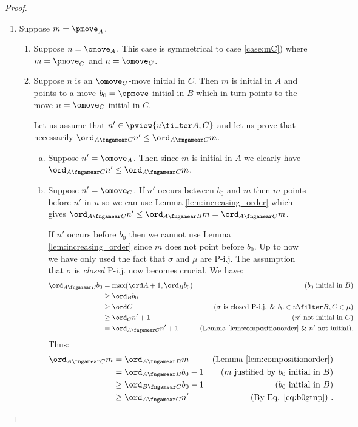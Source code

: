 \begin{proof}
\begin{enumerate}[1)]
\item \label{case:mA} Suppose $m = \pmove_A$.
\begin{enumerate}

\item Suppose $n=\omove_A$.
This case is symmetrical to case
\ref{case:mC}) where $m=\pmove_C$ and $n=\omove_C$.

\item Suppose  $n$ is an $\omove_C$-move initial in $C$.
Then $m$ is initial in $A$ and points to a move
$b_0 = \opmove$ initial in $B$ which in turn points to the
move $n =\omove_C$ initial in $C$.

Let us assume that $n'\in \pview{u\filter A,C}$ and let us prove that necessarily $\ord_{A\fngamear C} n' \leq \ord_{A\fngamear C} m$.

	\begin{enumerate}[a.]
	\item Suppose $n'=\omove_A$. Then
since $m$ is initial in $A$ we clearly have 
$\ord_{A\fngamear C} n' \leq \ord_{A\fngamear C} m$.

	\item Suppose $n'=\omove_C$.
	If $n'$ occurs between $b_0$ and $m$ then $m$ points before $n'$ in 		$u$ so we can use Lemma \ref{lem:increasing_order} which gives $\ord_{A\fngamear C} n' \leq \ord_{A\fngamear B} m
		= \ord_{A\fngamear C} m$.
		\smallskip
		
		
		If $n'$ occurs before $b_0$ then 
		we cannot use Lemma \ref{lem:increasing_order}
		since $m$ does not point before $b_0$.
Up to now we have only used the fact that $\sigma$ and $\mu$ are P-i.j. The assumption that $\sigma$ is  \emph{closed} P-i.j. now becomes crucial. We have:
		\begin{align}
		\ord_{A\fngamear B} b_0 
		& = \max(\ord A +1, \ord_B b_0) & \mbox{($b_0$ initial in $B$)} \nonumber \\
		& \geq \ord_B b_0 \nonumber  \\
		& \geq \ord C & \mbox{($\sigma$ is closed P-i.j. \& $b_0 \in u \filter  B,C \in \mu$)} \nonumber  \\
		& \geq \ord_C n' +1 & \mbox{($n'$ not initial in $C$)} \nonumber  \\
		& = \ord_{A\fngamear C} n' +1 & \mbox{(Lemma \ref{lem:compositionorder} \& $n'$ not initial)}. \label{eq:b0gtnp}
		\end{align}
Thus:
		\begin{align*}
		\ord_{A\fngamear C} m 
		& = \ord_{A\fngamear B} m & \mbox{(Lemma \ref{lem:compositionorder})} \\
		& = \ord_{A\fngamear B} b_0 -1  & \mbox{($m$ justified by $b_0$ initial in $B$)} \\
		& \geq \ord_{B\fngamear C} b_0 -1 & \mbox{($b_0$ initial in $B$)} \\
		& \geq \ord_{A\fngamear C} n' & \mbox{(By Eq. \ref{eq:b0gtnp})} \ .
		\end{align*}
		\end{enumerate}


\end{enumerate}
\end{enumerate}
\end{proof}
